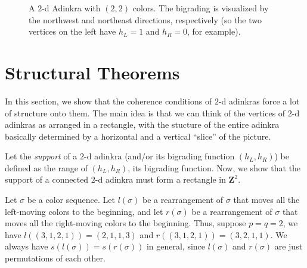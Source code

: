 \documentclass[12pt,twoside,singlespace]{article}
\numberwithin{equation}{section}
\theoremstyle{definition}
\newcommand{\ZZ}{\mathbf{Z}}
\begin{document}
\begin{figure}[htb]
\begin{center}

\caption{A $2$-d Adinkra with $(2,2)$ colors. The bigrading is visualized by the northwest and northeast directions, respectively (so the two vertices on the left have $h_L = 1$ and $h_R = 0$, for example). \label{fig:2d-example}}
\end{center}
\end{figure}

\section{Structural Theorems}
\label{sec:structural}

In this section, we show that the coherence conditions of $2$-d adinkras force a lot of structure onto them. The main idea is that we can think of the vertices of $2$-d adinkras as arranged in a rectangle, with the stucture of the entire adinkra basically determined by a horizontal and a vertical ``slice'' of the picture.

Let the \emph{support} of a $2$-d adinkra (and/or its bigrading function $(h_L,h_R)$) be defined as the range of $(h_L,h_R)$, its bigrading function. Now, we show that the support of a connected $2$-d adinkra must form a rectangle in $\ZZ^2$.

Let $\sigma$ be a color sequence.  Let $l(\sigma)$ be a rearrangement of $\sigma$ that moves all the left-moving colors to the beginning, and let $r(\sigma)$ be a rearrangement of $\sigma$ that moves all the right-moving colors to the beginning. Thus, suppose $p = q = 2$, we have $l((3,1,2,1)) = (2,1,1,3)$ and $r((3,1,2,1)) = (3,2,1,1)$. We always have $s(l(\sigma)) = s(r(\sigma))$ in general, since $l(\sigma)$ and $r(\sigma)$ are just permutations of each other.
\end{document}
